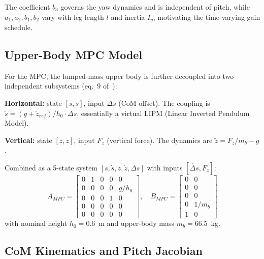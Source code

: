 \documentclass[11pt,a4paper]{article}
\begin{document}
The coefficient $b_3$ governs the yaw dynamics and is independent of pitch, while
$a_1,a_2,b_1,b_2$ vary with leg length $l$ and inertia $I_y$, motivating the
time-varying gain schedule.

\subsection{Upper-Body MPC Model}

For the MPC, the lumped-mass upper body is further decoupled into two independent
subsystems (eq.~9 of~\cite{cui2022}):

\textbf{Horizontal:} state $[s,\dot{s}]$, input $\Delta s$ (CoM offset).  The coupling is
$\ddot{s} = (g + \ddot{z}_{ref})/h_0 \cdot \Delta s$, essentially a virtual LIPM
(Linear Inverted Pendulum Model).

\textbf{Vertical:} state $[z,\dot{z}]$, input $F_z$ (vertical force).  The dynamics are
$\ddot{z} = F_z/m_b - g$.

Combined as a 5-state system $[s,\dot{s},z,\dot{z},\Delta s]$ with inputs
$[\dot{\Delta s}, F_z]$:
\begin{equation}
    A_{MPC} = \begin{bmatrix}
        0 & 1 & 0 & 0 & 0 \\
        0 & 0 & 0 & 0 & g/h_0 \\
        0 & 0 & 0 & 1 & 0 \\
        0 & 0 & 0 & 0 & 0 \\
        0 & 0 & 0 & 0 & 0
    \end{bmatrix},\quad
    B_{MPC} = \begin{bmatrix}
        0 & 0 \\ 0 & 0 \\ 0 & 0 \\ 0 & 1/m_b \\ 1 & 0
    \end{bmatrix}
\end{equation}
with nominal height $h_0 = 0.6$~m and upper-body mass $m_b = 66.5$~kg.

\subsection{CoM Kinematics and Pitch Jacobian}
\end{document}
